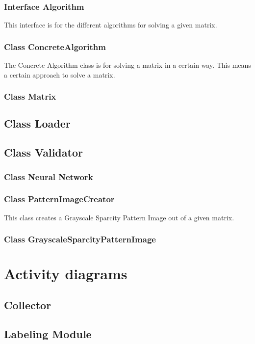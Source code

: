 \documentclass[parskip=full]{scrartcl}
\begin{document}
\subsubsection{Interface Algorithm}
This interface is for the different algorithms for solving a given matrix.
\subsubsection{Class ConcreteAlgorithm}
The Concrete Algorithm class is for solving a matrix in a certain way.
This means a certain approach to solve a matrix.
\subsubsection{Class Matrix}

\subsection{Class Loader}

\subsection{Class Validator}

\subsubsection{Class Neural Network}

\subsubsection{Class PatternImageCreator}
This class creates a Grayscale Sparcity Pattern Image out of a given matrix.
\subsubsection{Class GrayscaleSparcityPatternImage}

\section{Activity diagrams}


\subsection{Collector}
\subsection{Labeling Module}
\end{document}
